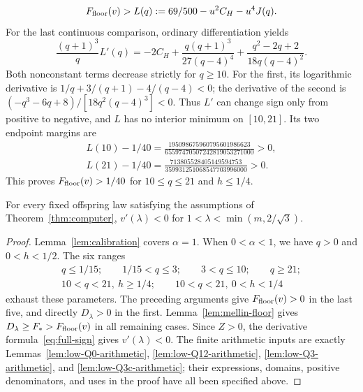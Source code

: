 \[
 F_{\rm floor}(v)>L(q):=69/500-u^2C_H-u^4J(q).
\]
For the last continuous comparison, ordinary differentiation yields
\[
 \frac{(q+1)^3}{q}L'(q)
 =-2C_H+\frac{q(q+1)^3}{27(q-4)^4}
              +\frac{q^2-2q+2}{18q(q-4)^2}.
\]
Both nonconstant terms decrease strictly for $q\ge10$.
For the first, its logarithmic derivative is
$1/q+3/(q+1)-4/(q-4)<0$; the derivative of the second is
$(-q^3-6q+8)/[18q^2(q-4)^3]<0$.
Thus $L'$ can change sign only from positive to negative, and
$L$ has no interior minimum on $[10,21]$.  Its two endpoint
margins are
\[\begin{gathered}
 L(10)-1/40=\frac{195098675960795601986623}{65597470507242819053271000}>0,
 \\
 L(21)-1/40=\frac{713805528405149594753}{359931251068547703996000}>0.
\end{gathered}\]
This proves $F_{\rm floor}(v)>1/40$ for $10\le q\le21$ and $h\le1/4$.

\begin{proposition}\label{prop:entire-low-region}
For every fixed offspring law satisfying the assumptions of Theorem~\ref{thm:computer},
$v'(\lambda)<0$ for $1<\lambda<\min(m,2/\sqrt3)$.
\end{proposition}
\begin{proof}
Lemma~\ref{lem:calibration} covers $\alpha=1$. When $0<\alpha<1$,
we have $q>0$ and $0<h<1/2$. The six ranges
\[\begin{gathered}
 q\le1/15;\qquad1/15<q\le3;\qquad3<q\le10;\qquad q\ge21;\\
 10<q<21,\ h\ge1/4;\qquad10<q<21,\ 0<h<1/4
\end{gathered}\]
exhaust these parameters.  The preceding arguments give
$F_{\rm floor}(v)>0$ in the last five, and directly $D_\lambda>0$
in the first.  Lemma~\ref{lem:mellin-floor} gives
$D_\lambda\ge F_*>F_{\rm floor}(v)$ in all remaining cases.
Since $Z>0$, the derivative formula~\eqref{eq:full-sign} gives
$v'(\lambda)<0$. The finite arithmetic inputs are
exactly Lemmas~\ref{lem:low-Q0-arithmetic},
\ref{lem:low-Q12-arithmetic}, \ref{lem:low-Q3-arithmetic}, and
\ref{lem:low-Q3c-arithmetic}; their expressions, domains, positive
denominators, and uses in the proof have all been specified above.
\end{proof}
